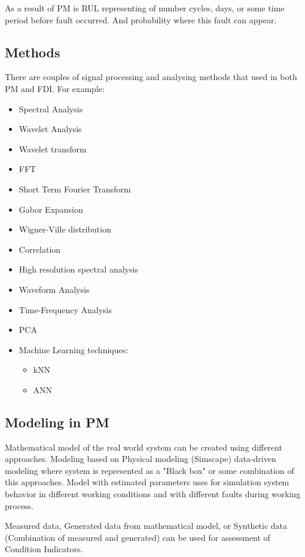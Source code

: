 \documentclass[class=article, crop=false]{standalone}
\begin{document}
As a result of PM is RUL representing of number cycles, days, or some time
period before fault occurred. And probability where this fault can appear.

\subsection{Methods}
There are couples of signal processing and analysing methods that used in
both PM and FDI. For example:
\begin{itemize}
    \item Spectral Analysis
    \item Wavelet Analysis
    \item Wavelet transform
    \item FFT
    \item Short Term Fourier Transform
    \item Gabor Expansion
    \item Wigner-Ville distribution
    \item Correlation
    \item High resolution spectral analysis
    \item Waveform Analysis
    \item Time-Frequency Analysis
    \item PCA
    \item Machine Learning techniques:
        \begin{itemize}
            \item kNN
            \item ANN
        \end{itemize}
\end{itemize}

\subsection{Modeling in PM}

Mathematical model of the real world system can be created using different
approaches. Modeling based on Physical modeling (Simscape) data-driven
modeling where system is represented as a "Black box" or some combination
of this approaches.
Model with estimated parameters uses for simulation system behavior in
different working conditions and with different faults during working
process.

Measured data, Generated data from mathematical model, or Synthetic data
(Combination of measured and generated) can be used for assessment of
Condition Indicators. 
\end{document}
